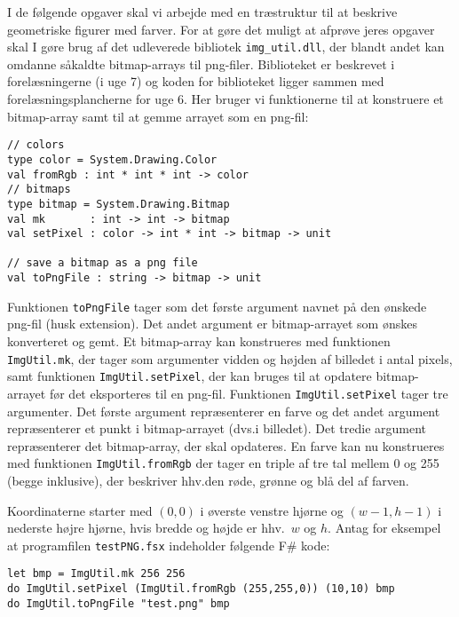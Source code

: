 I de følgende opgaver skal vi arbejde med en træstruktur til at beskrive geometriske
figurer med farver.  For at gøre det muligt at afprøve jeres opgaver
skal I gøre brug af det udleverede bibliotek \texttt{img\_util.dll}, der
blandt andet kan omdanne såkaldte bitmap-arrays til png-filer.  Biblioteket er
beskrevet i forelæsningerne (i uge 7) og koden for biblioteket ligger
sammen med forelæsningsplancherne for uge 6.  Her bruger vi
funktionerne til at konstruere et bitmap-array samt til at gemme
arrayet som en png-fil:

\begin{lstlisting}[numbers=none,frame=none,mathescape]
// colors
type color = System.Drawing.Color
val fromRgb : int * int * int -> color
// bitmaps
type bitmap = System.Drawing.Bitmap
val mk       : int -> int -> bitmap
val setPixel : color -> int * int -> bitmap -> unit

// save a bitmap as a png file
val toPngFile : string -> bitmap -> unit
\end{lstlisting}

Funktionen \lstinline{toPngFile} tager som det første argument navnet
på den ønskede png-fil (husk extension).  Det andet argument er
bitmap-arrayet som ønskes konverteret og gemt. Et bitmap-array kan
konstrueres med funktionen \lstinline{ImgUtil.mk}, der tager som
argumenter vidden og højden af billedet i antal pixels, samt funktionen
\lstinline{ImgUtil.setPixel}, der kan bruges til at opdatere bitmap-arrayet
før det eksporteres til en png-fil. Funktionen \lstinline{ImgUtil.setPixel}
tager tre argumenter. Det første argument repræsenterer en farve og
det andet argument repræsenterer et punkt i bitmap-arrayet (dvs.\@ i
billedet). Det tredie argument repræsenterer det bitmap-array, der
skal opdateres.  En farve kan nu konstrueres med funktionen
\lstinline{ImgUtil.fromRgb} der tager en triple af tre tal mellem 0 og
255 (begge inklusive), der beskriver hhv.\@ den røde, grønne og blå del
af farven.

Koordinaterne starter med $(0,0)$ i øverste venstre hjørne og
$(w-1,h-1)$ i nederste højre hjørne, hvis bredde og højde er hhv.\ $w$
og $h$.  Antag for eksempel at programfilen \texttt{testPNG.fsx}
indeholder følgende F\# kode:

\begin{lstlisting}[numbers=none,frame=none,mathescape]
let bmp = ImgUtil.mk 256 256
do ImgUtil.setPixel (ImgUtil.fromRgb (255,255,0)) (10,10) bmp
do ImgUtil.toPngFile "test.png" bmp
\end{lstlisting}

